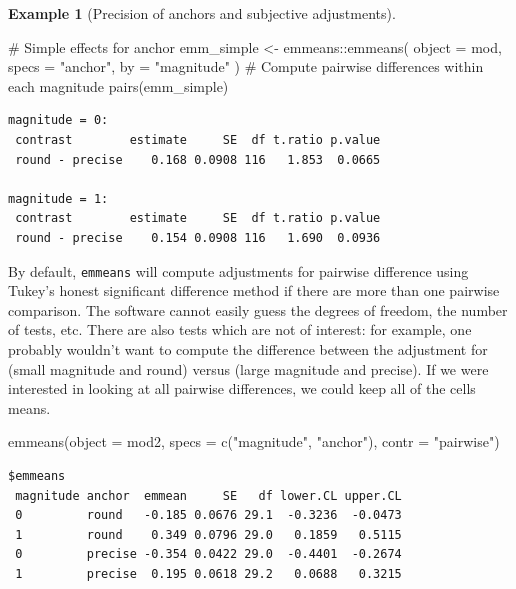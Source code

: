 \documentclass[
  11pt,
  letterpaper,
]{scrbook}
\newenvironment{Shaded}{\begin{snugshade}}{\end{snugshade}}
\newcommand{\AttributeTok}[1]{\textcolor[rgb]{0.40,0.45,0.13}{#1}}
\newcommand{\CommentTok}[1]{\textcolor[rgb]{0.37,0.37,0.37}{#1}}
\newcommand{\FunctionTok}[1]{\textcolor[rgb]{0.28,0.35,0.67}{#1}}
\newcommand{\NormalTok}[1]{\textcolor[rgb]{0.00,0.23,0.31}{#1}}
\newcommand{\OtherTok}[1]{\textcolor[rgb]{0.00,0.23,0.31}{#1}}
\newcommand{\SpecialCharTok}[1]{\textcolor[rgb]{0.37,0.37,0.37}{#1}}
\newcommand{\StringTok}[1]{\textcolor[rgb]{0.13,0.47,0.30}{#1}}
\theoremstyle{definition}
\theoremstyle{definition}
\newtheorem{example}{Example}[chapter]
\theoremstyle{remark}
\begin{document}
\begin{example}[Precision of anchors and subjective
adjustments]
\begin{Shaded}
\begin{Highlighting}[]
\CommentTok{\# Simple effects for anchor}
\NormalTok{emm\_simple }\OtherTok{\textless{}{-}}\NormalTok{ emmeans}\SpecialCharTok{::}\FunctionTok{emmeans}\NormalTok{(}
  \AttributeTok{object =}\NormalTok{ mod,}
  \AttributeTok{specs =} \StringTok{"anchor"}\NormalTok{,}
  \AttributeTok{by =} \StringTok{"magnitude"}
\NormalTok{)}
\CommentTok{\# Compute pairwise differences within each magnitude}
\FunctionTok{pairs}\NormalTok{(emm\_simple)}
\end{Highlighting}
\end{Shaded}

\begin{verbatim}
magnitude = 0:
 contrast        estimate     SE  df t.ratio p.value
 round - precise    0.168 0.0908 116   1.853  0.0665

magnitude = 1:
 contrast        estimate     SE  df t.ratio p.value
 round - precise    0.154 0.0908 116   1.690  0.0936
\end{verbatim}

By default, \texttt{emmeans} will compute adjustments for pairwise
difference using Tukey's honest significant difference method if there
are more than one pairwise comparison. The software cannot easily guess
the degrees of freedom, the number of tests, etc. There are also tests
which are not of interest: for example, one probably wouldn't want to
compute the difference between the adjustment for (small magnitude and
round) versus (large magnitude and precise). If we were interested in
looking at all pairwise differences, we could keep all of the cells
means.

\begin{Shaded}
\begin{Highlighting}[]
\FunctionTok{emmeans}\NormalTok{(}\AttributeTok{object =}\NormalTok{ mod2, }
        \AttributeTok{specs =} \FunctionTok{c}\NormalTok{(}\StringTok{"magnitude"}\NormalTok{, }\StringTok{"anchor"}\NormalTok{), }
        \AttributeTok{contr =} \StringTok{"pairwise"}\NormalTok{)}
\end{Highlighting}
\end{Shaded}

\begin{verbatim}
$emmeans
 magnitude anchor  emmean     SE   df lower.CL upper.CL
 0         round   -0.185 0.0676 29.1  -0.3236  -0.0473
 1         round    0.349 0.0796 29.0   0.1859   0.5115
 0         precise -0.354 0.0422 29.0  -0.4401  -0.2674
 1         precise  0.195 0.0618 29.2   0.0688   0.3215


\end{verbatim}
\end{example}
\end{document}
